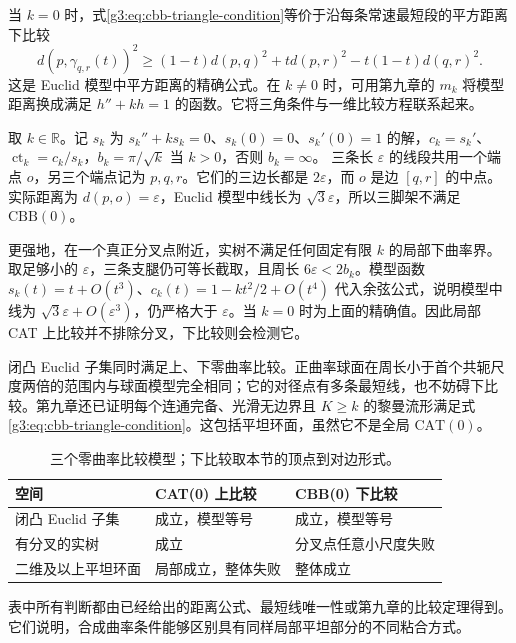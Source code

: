 当 \(k=0\) 时，式\eqref{g3:eq:cbb-triangle-condition}等价于沿每条常速最短段的平方距离下比较
\begin{equation}\label{g3:eq:cbb-zero-distance}
	d(p,\gamma_{q,r}(t))^2
	\ge(1-t)d(p,q)^2+td(p,r)^2-t(1-t)d(q,r)^2.
\end{equation}
这是 Euclid 模型中平方距离的精确公式。在 \(k\ne0\) 时，可用第九章的 \(m_k\) 将模型距离换成满足 \(h''+kh=1\) 的函数。它将三角条件与一维比较方程联系起来。

\begin{example}\label{g3:exm:tripod-no-lower-bound}
	取 \(k\in\mathbb R\)。记 \(s_k\) 为 \(s_k''+ks_k=0\)、\(s_k(0)=0\)、\(s_k'(0)=1\) 的解，\(c_k=s_k'\)、\(\operatorname{ct}_k=c_k/s_k\)，\(b_k=\pi/\sqrt k\) 当 \(k>0\)，否则 \(b_k=\infty\)。
	三条长 \(\varepsilon\) 的线段共用一个端点 \(o\)，另三个端点记为 \(p,q,r\)。它们的三边长都是 \(2\varepsilon\)，而 \(o\) 是边 \([q,r]\) 的中点。实际距离为 \(d(p,o)=\varepsilon\)，Euclid 模型中线长为 \(\sqrt3\varepsilon\)，所以三脚架不满足 \(\mathrm{CBB}(0)\)。

	更强地，在一个真正分叉点附近，实树不满足任何固定有限 \(k\) 的局部下曲率界。取足够小的 \(\varepsilon\)，三条支腿仍可等长截取，且周长 \(6\varepsilon<2b_k\)。模型函数 \(s_k(t)=t+O(t^3)\)、\(c_k(t)=1-kt^2/2+O(t^4)\) 代入余弦公式，说明模型中线为 \(\sqrt3\varepsilon+O(\varepsilon^3)\)，仍严格大于 \(\varepsilon\)。当 \(k=0\) 时为上面的精确值。因此局部 CAT 上比较并不排除分叉，下比较则会检测它。
\end{example}

闭凸 Euclid 子集同时满足上、下零曲率比较。正曲率球面在周长小于首个共轭尺度两倍的范围内与球面模型完全相同；它的对径点有多条最短线，也不妨碍下比较。第九章还已证明每个连通完备、光滑无边界且 \(K\ge k\) 的黎曼流形满足式\eqref{g3:eq:cbb-triangle-condition}。这包括平坦环面，虽然它不是全局 \(\mathrm{CAT}(0)\)。

\begin{table}[htbp]
	\centering
	\caption{三个零曲率比较模型；下比较取本节的顶点到对边形式。}
	\label{g3:tab:synthetic-models}
	\begin{tabularx}{\textwidth}{@{}lXX@{}}
		\toprule
		空间 & CAT(0) 上比较 & CBB(0) 下比较\\
		\midrule
		闭凸 Euclid 子集 & 成立，模型等号 & 成立，模型等号\\
		有分叉的实树 & 成立 & 分叉点任意小尺度失败\\
		二维及以上平坦环面 & 局部成立，整体失败 & 整体成立\\
		\bottomrule
	\end{tabularx}
\end{table}
表中所有判断都由已经给出的距离公式、最短线唯一性或第九章的比较定理得到。它们说明，合成曲率条件能够区别具有同样局部平坦部分的不同粘合方式。


